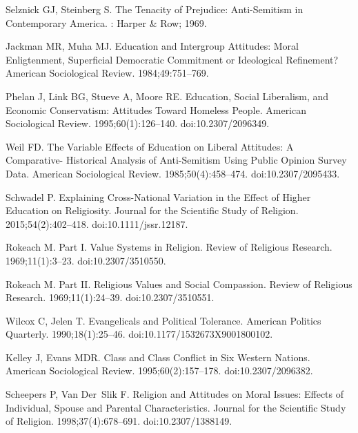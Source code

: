 \documentclass[10pt,letterpaper]{article}
\begin{document}
\begin{thebibliography}{10}
Selznick GJ, Steinberg S.
\newblock The {{Tenacity}} of {{Prejudice}}: Anti-{{Semitism}} in
  {{Contemporary America}}.
: {Harper \& Row}; 1969.

Jackman MR, Muha MJ.
\newblock Education and {{Intergroup Attitudes}}: {{Moral Enligtenment}},
  {{Superficial Democratic Commitment}} or {{Ideological Refinement}}?
\newblock American Sociological Review. 1984;49:751--769.

Phelan J, Link BG, Stueve A, Moore RE.
\newblock Education, {{Social Liberalism}}, and {{Economic Conservatism}}:
  {{Attitudes Toward Homeless People}}.
\newblock American Sociological Review. 1995;60(1):126--140.
\newblock doi:{10.2307/2096349}.

Weil FD.
\newblock The {{Variable Effects}} of {{Education}} on {{Liberal Attitudes}}:
  {{A Comparative}}- {{Historical Analysis}} of {{Anti}}-{{Semitism Using
  Public Opinion Survey Data}}.
\newblock American Sociological Review. 1985;50(4):458--474.
\newblock doi:{10.2307/2095433}.

Schwadel P.
\newblock Explaining {{Cross}}-{{National Variation}} in the {{Effect}} of
  {{Higher Education}} on {{Religiosity}}.
\newblock Journal for the Scientific Study of Religion. 2015;54(2):402--418.
\newblock doi:{10.1111/jssr.12187}.

Rokeach M.
\newblock Part {{I}}. {{Value Systems}} in {{Religion}}.
\newblock Review of Religious Research. 1969;11(1):3--23.
\newblock doi:{10.2307/3510550}.

Rokeach M.
\newblock Part {{II}}. {{Religious Values}} and {{Social Compassion}}.
\newblock Review of Religious Research. 1969;11(1):24--39.
\newblock doi:{10.2307/3510551}.

Wilcox C, Jelen T.
\newblock Evangelicals and {{Political Tolerance}}.
\newblock American Politics Quarterly. 1990;18(1):25--46.
\newblock doi:{10.1177/1532673X9001800102}.

Kelley J, Evans MDR.
\newblock Class and {{Class Conflict}} in {{Six Western Nations}}.
\newblock American Sociological Review. 1995;60(2):157--178.
\newblock doi:{10.2307/2096382}.

Scheepers P, Van Der~Slik F.
\newblock Religion and {{Attitudes}} on {{Moral Issues}}: {{Effects}} of
  {{Individual}}, {{Spouse}} and {{Parental Characteristics}}.
\newblock Journal for the Scientific Study of Religion. 1998;37(4):678--691.
\newblock doi:{10.2307/1388149}.


\end{thebibliography}
\end{document}
